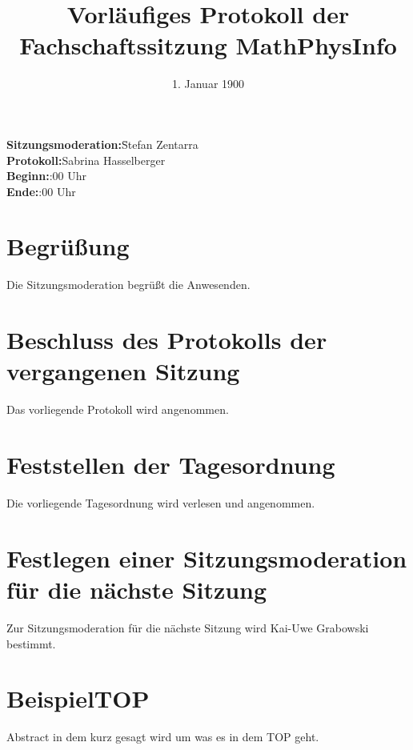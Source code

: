 \documentclass[fachschaft=mathphys]{mathphys/mathphys-protocol}
\begin{document}
\date{\vspace{-2em}1. Januar 1900\vspace{-1em}} %
\title{\vspace{-2em}Vorläufiges Protokoll der Fachschaftssitzung MathPhysInfo} %
\maketitle

\begin{tabbing}
\textbf{Sitzungsmoderation:}\quad\=Stefan Zentarra\\ %
\textbf{Protokoll:}\>Sabrina Hasselberger\\ %
\textbf{Beginn:}:00 Uhr\\
\textbf{Ende:}:00 Uhr\\ %
\end{tabbing}

\section{Begrüßung}
Die Sitzungsmoderation begrüßt die Anwesenden.

\section{Beschluss des Protokolls der vergangenen Sitzung}
Das vorliegende Protokoll wird angenommen.

\section{Feststellen der Tagesordnung}
Die vorliegende Tagesordnung wird verlesen und angenommen.

\section{Festlegen einer Sitzungsmoderation für die nächste Sitzung}
Zur Sitzungsmoderation für die nächste Sitzung wird Kai-Uwe Grabowski bestimmt. %

\section{BeispielTOP} %
Abstract in dem kurz gesagt wird um was es in dem TOP geht. %
\end{document}
